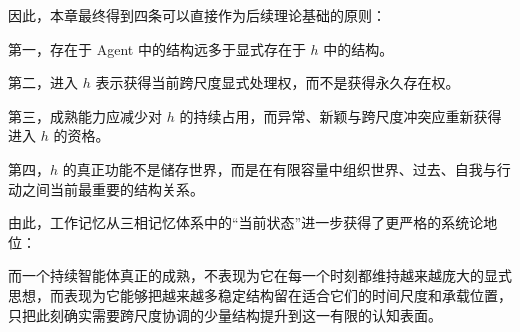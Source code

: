 因此，本章最终得到四条可以直接作为后续理论基础的原则：

\begin{proposition*}
第一，存在于 Agent 中的结构远多于显式存在于 $h$ 中的结构。
\end{proposition*}

\begin{statementbox}
第二，进入 $h$ 表示获得当前跨尺度显式处理权，而不是获得永久存在权。
\end{statementbox}

\begin{statementbox}
第三，成熟能力应减少对 $h$ 的持续占用，而异常、新颖与跨尺度冲突应重新获得进入 $h$ 的资格。
\end{statementbox}

\begin{statementbox}
第四，$h$ 的真正功能不是储存世界，而是在有限容量中组织世界、过去、自我与行动之间当前最重要的结构关系。
\end{statementbox}

由此，工作记忆从三相记忆体系中的“当前状态”进一步获得了更严格的系统论地位：

\begin{statementbox}
\centering
{}
\end{statementbox}

而一个持续智能体真正的成熟，不表现为它在每一个时刻都维持越来越庞大的显式思想，而表现为它能够把越来越多稳定结构留在适合它们的时间尺度和承载位置，只把此刻确实需要跨尺度协调的少量结构提升到这一有限的认知表面。
